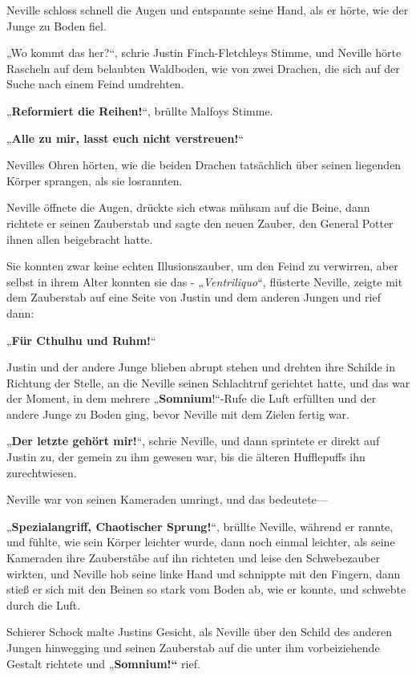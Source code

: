{Neville schloss schnell die Augen und entspannte seine Hand, als er hörte, wie der Junge zu Boden fiel.

„Wo kommt das her?“, schrie Justin Finch-Fletchleys Stimme, und Neville hörte Rascheln auf dem belaubten Waldboden, wie von zwei Drachen, die sich auf der Suche nach einem Feind umdrehten.

„\textbf{Reformiert die Reihen!}“, brüllte Malfoys Stimme.

„\textbf{Alle zu mir, lasst euch nicht verstreuen!}“

Nevilles Ohren hörten, wie die beiden Drachen tatsächlich über seinen liegenden Körper sprangen, als sie losrannten.

Neville öffnete die Augen, drückte sich etwas mühsam auf die Beine, dann richtete er seinen Zauberstab und sagte den neuen Zauber, den General Potter ihnen allen beigebracht hatte.

Sie konnten zwar keine echten Illusionszauber, um den Feind zu verwirren, aber selbst in ihrem Alter konnten sie das - „\emph{Ventriliquo}“, flüsterte Neville, zeigte mit dem Zauberstab auf eine Seite von Justin und dem anderen Jungen und rief dann:

„\textbf{Für Cthulhu und Ruhm!}“

Justin und der andere Junge blieben abrupt stehen und drehten ihre Schilde in Richtung der Stelle, an die Neville seinen Schlachtruf gerichtet hatte, und das war der Moment, in dem mehrere „\textbf{Somnium}!“-Rufe die Luft erfüllten und der andere Junge zu Boden ging, bevor Neville mit dem Zielen fertig war.

„\textbf{Der letzte gehört mir!}“, schrie Neville, und dann sprintete er direkt auf Justin zu, der gemein zu ihm gewesen war, bis die älteren Hufflepuffs ihn zurechtwiesen.

Neville war von seinen Kameraden umringt, und das bedeutete—

„\textbf{Spezialangriff, Chaotischer Sprung!}“, brüllte Neville, während er rannte, und fühlte, wie sein Körper leichter wurde, dann noch einmal leichter, als seine Kameraden ihre Zauberstäbe auf ihn richteten und leise den Schwebezauber wirkten, und Neville hob seine linke Hand und schnippte mit den Fingern, dann stieß er sich mit den Beinen so stark vom Boden ab, wie er konnte, und schwebte durch die Luft.

Schierer Schock malte Justins Gesicht, als Neville über den Schild des anderen Jungen hinwegging und seinen Zauberstab auf die unter ihm vorbeiziehende Gestalt richtete und „\textbf{Somnium!“} rief.

}
